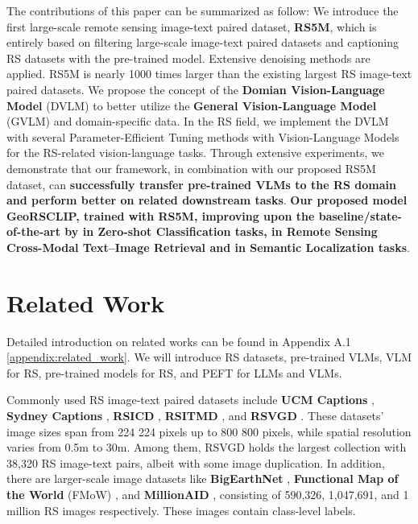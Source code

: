 \documentclass[journal]{IEEEtran}
\begin{document}
The contributions of this paper can be summarized as follow:  We introduce the first large-scale remote sensing image-text paired dataset, \textbf{RS5M}, which is entirely based on filtering large-scale image-text paired datasets and captioning RS datasets with the pre-trained model. Extensive denoising methods are applied. RS5M is nearly 1000 times larger than the existing largest RS image-text paired datasets.  We propose the concept of the \textbf{Domian Vision-Language Model} (DVLM) to better utilize the \textbf{General Vision-Language Model} (GVLM) and domain-specific data. In the RS field, we implement the DVLM with several Parameter-Efficient Tuning methods with Vision-Language Models for the RS-related vision-language tasks. Through extensive experiments, we demonstrate that our framework, in combination with our proposed RS5M dataset, can \textbf{successfully transfer pre-trained VLMs to the RS domain and perform better on related downstream tasks}. \textbf{Our proposed model GeoRSCLIP, trained with RS5M, improving upon the baseline/state-of-the-art by  in Zero-shot Classification tasks,  in Remote Sensing Cross-Modal Text–Image Retrieval and  in Semantic Localization tasks}. 


\section{Related Work} \label{relatedwork}
Detailed introduction on related works can be found in Appendix A.1 \ref{appendix:related_work}. We will introduce RS datasets, pre-trained VLMs, VLM for RS, pre-trained models for RS, and PEFT for LLMs and VLMs. 

Commonly used RS image-text paired datasets include \textbf{UCM Captions} \cite{UCMSydeney}, \textbf{Sydney Captions} \cite{UCMSydeney}, \textbf{RSICD} \cite{RSICD}, \textbf{RSITMD} \cite{RSITMD}, and \textbf{RSVGD} \cite{rsvg}. These datasets' image sizes span from 224  224 pixels up to 800  800 pixels, while spatial resolution varies from 0.5m to 30m. Among them, RSVGD holds the largest collection with 38,320 RS image-text pairs, albeit with some image duplication. In addition, there are larger-scale image datasets like \textbf{BigEarthNet} \cite{bigearthnet}, \textbf{Functional Map of the World} (FMoW) \cite{fmow}, and \textbf{MillionAID} \cite{millionaid}, consisting of 590,326, 1,047,691, and 1 million RS images respectively. These images contain class-level labels.
\end{document}
